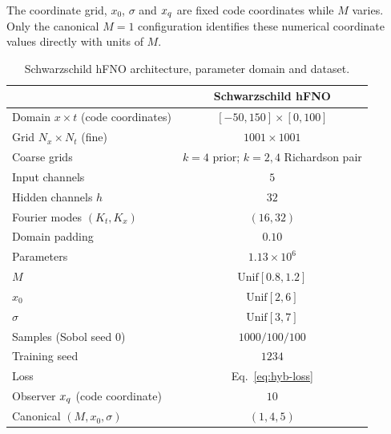 The coordinate grid, $x_0$, $\sigma$ and $x_{q}$ are fixed code
coordinates while $M$ varies. Only the canonical $M=1$ configuration
identifies these numerical coordinate values directly with units of
$M$.

\begin{table}[!htbp]
\centering
\caption{Schwarzschild hFNO architecture, parameter domain and
dataset.}
\label{tab:surrogate-config}
\footnotesize
\setlength{\tabcolsep}{5pt}
\begin{tabular}{@{}lc@{}}
\toprule
 & Schwarzschild hFNO \\
\midrule
Domain $x\times t$ (code coordinates) & $[-50,150]\times[0,100]$ \\
Grid $N_{x}\times N_{t}$ (fine) & $1001\times 1001$ \\
Coarse grids & $k{=}4$ prior; $k{=}2,4$ Richardson pair \\
Input channels & $5$ \\
Hidden channels $h$ & $32$ \\
Fourier modes $(K_{t},K_{x})$ & $(16,32)$ \\
Domain padding & $0.10$ \\
Parameters & $1.13\times 10^{6}$ \\
$M$ & $\mathrm{Unif}[0.8,1.2]$ \\
$x_{0}$ & $\mathrm{Unif}[2,6]$ \\
$\sigma$ & $\mathrm{Unif}[3,7]$ \\
Samples (Sobol seed $0$) & $1000/100/100$ \\
Training seed & $1234$ \\
Loss & Eq.~\eqref{eq:hyb-loss} \\
Observer $x_{q}$ (code coordinate) & $10$ \\
Canonical $(M,x_{0},\sigma)$ & $(1,4,5)$ \\
\bottomrule
\end{tabular}
\end{table}

